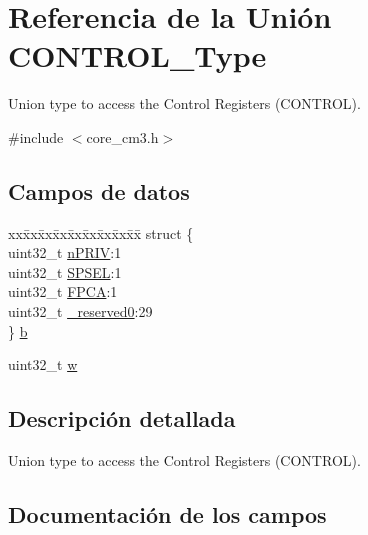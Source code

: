 \hypertarget{union_c_o_n_t_r_o_l___type}{}\section{Referencia de la Unión C\+O\+N\+T\+R\+O\+L\+\_\+\+Type}
\label{union_c_o_n_t_r_o_l___type}


Union type to access the Control Registers (C\+O\+N\+T\+R\+OL).  




{\ttfamily \#include $<$core\+\_\+cm3.\+h$>$}

\subsection*{Campos de datos}
\begin{DoxyCompactItemize}
\item 
\begin{tabbing}
xx\=xx\=xx\=xx\=xx\=xx\=xx\=xx\=xx\=\kill
struct \{\\
\>uint32\_t \mbox{\hyperlink{union_c_o_n_t_r_o_l___type_a2a6e513e8a6bf4e58db169e312172332}{nPRIV}}:1\\
\>uint32\_t \mbox{\hyperlink{union_c_o_n_t_r_o_l___type_ae185aac93686ffc78e998a9daf41415b}{SPSEL}}:1\\
\>uint32\_t \mbox{\hyperlink{union_c_o_n_t_r_o_l___type_a2518558c090f60161ba4e718a54ee468}{FPCA}}:1\\
\>uint32\_t \mbox{\hyperlink{union_c_o_n_t_r_o_l___type_ac8a6a13838a897c8d0b8bc991bbaf7c1}{\_reserved0}}:29\\
\} \mbox{\hyperlink{union_c_o_n_t_r_o_l___type_ab2a41711c248a319c2e7d0ab73c3a8b9}{b}}\\

\end{tabbing}\item 
uint32\+\_\+t \mbox{\hyperlink{union_c_o_n_t_r_o_l___type_ad0fb62e7a08e70fc5e0a76b67809f84b}{w}}
\end{DoxyCompactItemize}


\subsection{Descripción detallada}
Union type to access the Control Registers (C\+O\+N\+T\+R\+OL). 

\subsection{Documentación de los campos}
\mbox{\label{union_c_o_n_t_r_o_l___type_ac8a6a13838a897c8d0b8bc991bbaf7c1}} 
